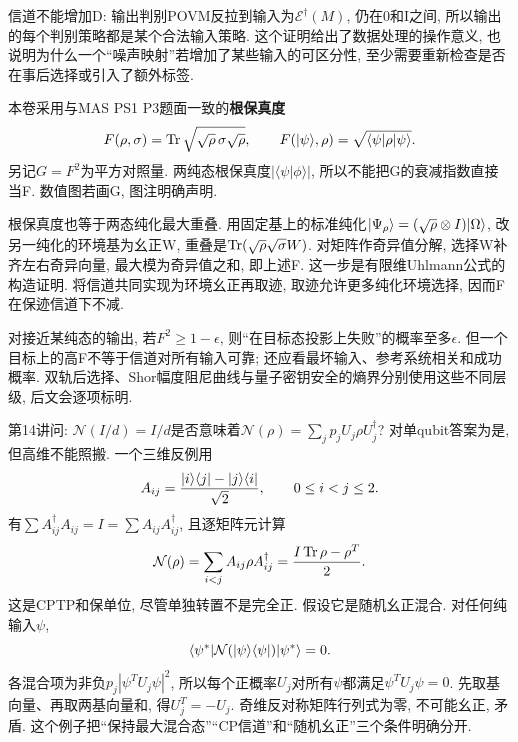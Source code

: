 信道不能增加D: 输出判别POVM反拉到输入为$\mathcal E^\dagger(M)$, 仍在0和I之间, 所以输出的每个判别策略都是某个合法输入策略. 这个证明给出了数据处理的操作意义, 也说明为什么一个“噪声映射”若增加了某些输入的可区分性, 至少需要重新检查是否在事后选择或引入了额外标签.

本卷采用与MAS PS1 P3题面一致的\textbf{根保真度}
\[F(\rho,\sigma)=\operatorname{Tr}\sqrt{\sqrt\rho\,\sigma\sqrt\rho},\qquad
F(\lvert \psi\rangle,\rho)=\sqrt{\langle \psi\rvert\rho\lvert \psi\rangle}.\]
另记$G=F^2$为平方对照量. 两纯态根保真度$|\langle\psi|\phi\rangle|$, 所以不能把G的衰减指数直接当F. 数值图若画G, 图注明确声明.

根保真度也等于两态纯化最大重叠. 用固定基上的标准纯化$\lvert \Psi_\rho\rangle=(\sqrt\rho\otimes I)\lvert \Omega\rangle$, 改另一纯化的环境基为幺正W, 重叠是$\operatorname{Tr}(\sqrt\rho\sqrt\sigma W)$. 对矩阵作奇异值分解, 选择W补齐左右奇异向量, 最大模为奇异值之和, 即上述F. 这一步是有限维Uhlmann公式的构造证明. 将信道共同实现为环境幺正再取迹, 取迹允许更多纯化环境选择, 因而F在保迹信道下不减.

对接近某纯态的输出, 若$F^2\ge1-\epsilon$, 则“在目标态投影上失败”的概率至多$\epsilon$. 但一个目标上的高F不等于信道对所有输入可靠; 还应看最坏输入、参考系统相关和成功概率. 双轨后选择、Shor幅度阻尼曲线与量子密钥安全的熵界分别使用这些不同层级, 后文会逐项标明.

第14讲问: $\mathcal N(I/d)=I/d$是否意味着$\mathcal N(\rho)=\sum_jp_jU_j\rho U_j^\dagger$? 对单qubit答案为是, 但高维不能照搬. 一个三维反例用
\[A_{ij}=\frac{\lvert i\rangle\langle j\rvert-\lvert j\rangle\langle i\rvert}{\sqrt2},\qquad 0\le i<j\le2.\]
有$\sum A_{ij}^\dagger A_{ij}=I=\sum A_{ij}A_{ij}^\dagger$, 且逐矩阵元计算
\[\mathcal N(\rho)=\sum_{i<j}A_{ij}\rho A_{ij}^\dagger
 =\frac{I\operatorname{Tr}\rho-\rho^T}{2}.\]
这是CPTP和保单位, 尽管单独转置不是完全正. 假设它是随机幺正混合. 对任何纯输入$\psi$,
\[\langle \psi^*\rvert\mathcal N(\lvert \psi\rangle\langle \psi\rvert)\lvert \psi^*\rangle=0.\]
各混合项为非负$p_j|\psi^TU_j\psi|^2$, 所以每个正概率$U_j$对所有$\psi$都满足$\psi^TU_j\psi=0$. 先取基向量、再取两基向量和, 得$U_j^T=-U_j$. 奇维反对称矩阵行列式为零, 不可能幺正, 矛盾. 这个例子把“保持最大混合态”“CP信道”和“随机幺正”三个条件明确分开.
